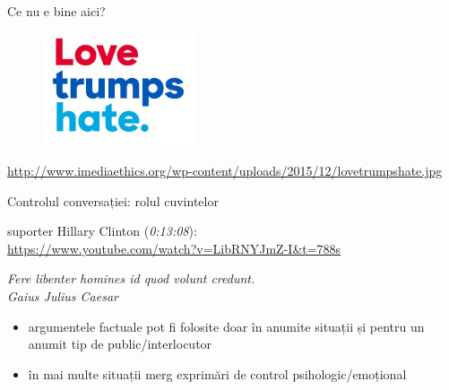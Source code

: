 \documentclass{beamer}
\begin{document}
\begin{frame}{Ce nu e bine aici?}
  \begin{figure}
    \centering
    \includegraphics[width=0.4\textwidth]{img/love-trumps-hate}
  \end{figure}
  \begin{center}
    \tiny
    \url{http://www.imediaethics.org/wp-content/uploads/2015/12/lovetrumpshate.jpg}
  \end{center}
\end{frame}

\begin{frame}{Controlul conversației: rolul cuvintelor}
  \begin{center}
    \scriptsize
    suporter Hillary Clinton (\textit{0:13:08}):\\
    \url{https://www.youtube.com/watch?v=LibRNYJmZ-I&t=788s}\\
  \end{center}
  \pause
  \vspace{5mm}
  \begin{center}
    \textit{Fere libenter homines id quod volunt credunt.}\\
    \vspace{3mm}
    \hfill \textit{Gaius Julius Caesar}\\
    \vspace{5mm}
  \end{center}
  \begin{itemize}
    \pause
    \item argumentele factuale pot fi folosite doar în anumite situații și pentru un anumit tip de public/interlocutor
    \pause
    \item în mai multe situații merg exprimări de control psihologic/emoțional
  \end{itemize}
\end{frame}
\end{document}
